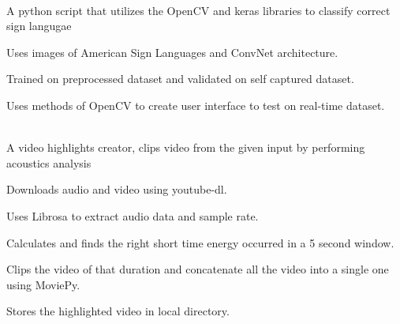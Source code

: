 \documentclass[]{deedy-resume-openfont}
\begin{document}
\begin{minipage}[t]{0.66\textwidth}

\\
A python script that utilizes the OpenCV and keras libraries to classify correct sign langugae

\begin{tightemize}
\item Uses images of American Sign Languages and ConvNet architecture. 
\item Trained on preprocessed dataset and validated on self captured dataset.
\item Uses methods of OpenCV to create user interface to test on real-time dataset.
\end{tightemize}
\sectionsep

\\
A video highlights creator, clips video from the given input by performing acoustics analysis\

\begin{tightemize}
\item Downloads audio and video using youtube-dl.
\item Uses Librosa to extract audio data and sample rate.
\item Calculates and finds the right short time energy occurred in a 5 second window.
\item Clips the video of that duration and concatenate all the video into a single one using MoviePy.
\item Stores the highlighted video in local directory.
\end{tightemize}
\sectionsep









\end{minipage}
\end{document}
